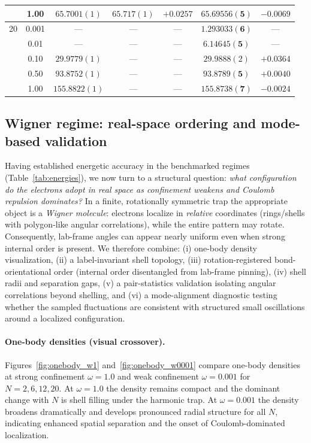 \documentclass[superscriptaddress,unsortedaddress,amsmath,amssymb,aps]{revtex4-2}
\begin{document}
\begin{table}[t]
\begin{threeparttable}
\begin{tabular}{c|c|c|cc|cc}
         & 1.00 & $65.7001(1)$  & $65.717(1)$   & $+0.0257$ & $\mathbf{65.69556(5)}$ & $-0.0069$ \\
      \midrule
      20 & 0.001 & ---          & --- & --- & $\mathbf{1.293033(6)}$ & --- \\
         & 0.01 & ---           & ---  & --- & $\mathbf{6.14645(5)}$ & --- \\
         & 0.10 & $29.9779(1)$ & ---  & --- & $29.9888(2)$ & $+0.0364$ \\
         & 0.50 & $93.8752(1)$  & ---  & --- & $\mathbf{93.8789(5)}$ & $+0.0040$ \\
         & 1.00 & $155.8822(1)$  & ---   & --- & $\mathbf{155.8738(7)}$ & $-0.0024$ \\
      \bottomrule
    \end{tabular}
  \end{threeparttable}
\end{table}
\subsection{Wigner regime: real-space ordering and mode-based validation}
\label{subsec:Wigner}

Having established energetic accuracy in the benchmarked regimes (Table~\ref{tab:energies}), we now turn to a
structural question: \emph{what configuration do the electrons adopt in real space as confinement weakens and Coulomb
repulsion dominates?}  In a finite, rotationally symmetric trap the appropriate object is a \emph{Wigner molecule}:
electrons localize in \emph{relative} coordinates (rings/shells with polygon-like angular correlations), while the
entire pattern may rotate. Consequently, lab-frame angles can appear nearly uniform even when strong internal order
is present. We therefore combine: (i) one-body density visualization, (ii) a label-invariant shell topology, (iii)
rotation-registered bond-orientational order (internal order disentangled from lab-frame pinning), (iv) shell radii
and separation gaps, (v) a pair-statistics validation isolating angular correlations beyond shelling, and (vi) a
mode-alignment diagnostic testing whether the sampled fluctuations are consistent with structured small oscillations
around a localized configuration.

\paragraph{One-body densities (visual crossover).}
Figures~\ref{fig:onebody_w1} and~\ref{fig:onebody_w0001} compare one-body densities at strong confinement
$\omega=1.0$ and weak confinement $\omega=0.001$ for $N=2,6,12,20$. At $\omega=1.0$ the density remains compact and
the dominant change with $N$ is shell filling under the harmonic trap. At $\omega=0.001$ the density broadens
dramatically and develops pronounced radial structure for all $N$, indicating enhanced spatial separation and the
onset of Coulomb-dominated localization.
\end{document}
